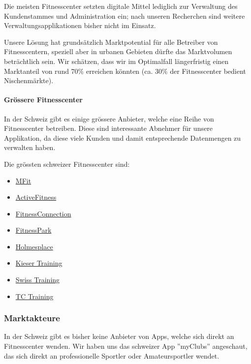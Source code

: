 Die meisten Fitnesscenter setzten digitale Mittel lediglich zur Verwaltung des Kundenstammes und Administration ein; nach unseren Recherchen sind weitere Verwaltungsapplikationen bisher nicht im Einsatz.

Unsere Lösung hat grundsätzlich Marktpotential für alle Betreiber von Fitnesscentern, speziell aber in urbanen Gebieten dürfte das Marktvolumen beträchtlich sein. Wir schätzen, dass wir im Optimalfall längerfristig einen Marktanteil von rund 70\% erreichen könnten (ca. 30\% der Fitnesscenter bedient Nischenmärkte).

\paragraph{Grössere Fitnesscenter}
In der Schweiz gibt es einige grössere Anbieter, welche eine Reihe von Fitnesscenter betreiben. Diese sind interessante Abnehmer für unsere Applikation, da diese viele Kunden und damit entsprechende Datenmengen zu verwalten haben.

Die grössten schweizer Fitnesscenter sind\cite{fitness+tribune}:

\begin{multicols}{2}
	\begin{itemize}
		\item \href{http://mfit.ch/}{MFit}
		\item \href{http://www.activfitness.ch/}{ActiveFitness}
		\item \href{http://fitnessconnection.ch/}{FitnessConnection}
		\item \href{http://www.fitnesspark.ch/}{FitnessPark}
		\item \href{http://holmesplace.ch/de/}{Holmesplace}
		\item \href{http://www.kieser-training.com/}{Kieser Training}
		\item \href{http://www.swiss-training.com/}{Swiss Training}
		\item \href{http://tc-training.ch/}{TC Training}
	\end{itemize}
\end{multicols}

\subsubsection{Marktakteure}
In der Schweiz gibt es bisher keine Anbieter von Apps, welche sich direkt an Fitnesscenter wenden. Wir haben uns das schweizer App ''myClubs'' angeschaut, das sich direkt an professionelle Sportler oder Amateursportler wendet.

